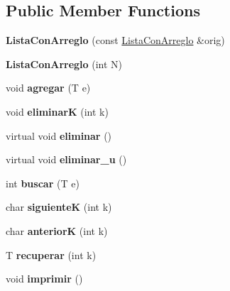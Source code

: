 \subsection*{Public Member Functions}
\begin{DoxyCompactItemize}
\item 
\hypertarget{class_lista_con_arreglo_ab7a22a8f04de9403d32a7431d4dd9627}{{\bfseries Lista\+Con\+Arreglo} (const \hyperlink{class_lista_con_arreglo}{Lista\+Con\+Arreglo} \&orig)}\label{class_lista_con_arreglo_ab7a22a8f04de9403d32a7431d4dd9627}

\item 
\hypertarget{class_lista_con_arreglo_a9541812a0019b76c6529184356913a59}{{\bfseries Lista\+Con\+Arreglo} (int N)}\label{class_lista_con_arreglo_a9541812a0019b76c6529184356913a59}

\item 
\hypertarget{class_lista_con_arreglo_a5336f6ef59e2cfaa008c4ad8cbee9f25}{void {\bfseries agregar} (T e)}\label{class_lista_con_arreglo_a5336f6ef59e2cfaa008c4ad8cbee9f25}

\item 
\hypertarget{class_lista_con_arreglo_acd8b8f484dc440dc64dc58cad375e7e4}{void {\bfseries eliminar\+K} (int k)}\label{class_lista_con_arreglo_acd8b8f484dc440dc64dc58cad375e7e4}

\item 
\hypertarget{class_lista_con_arreglo_a1d4ea3c3bbefa8d2c12ea520e12f5f9c}{virtual void {\bfseries eliminar} ()}\label{class_lista_con_arreglo_a1d4ea3c3bbefa8d2c12ea520e12f5f9c}

\item 
\hypertarget{class_lista_con_arreglo_a9f0f4138dcf42e664213ffbcedce2056}{virtual void {\bfseries eliminar\+\_\+u} ()}\label{class_lista_con_arreglo_a9f0f4138dcf42e664213ffbcedce2056}

\item 
\hypertarget{class_lista_con_arreglo_af2fe968f5ec674cb9640e11a1bcaab99}{int {\bfseries buscar} (T e)}\label{class_lista_con_arreglo_af2fe968f5ec674cb9640e11a1bcaab99}

\item 
\hypertarget{class_lista_con_arreglo_a8a3d5d83291eeab7d9dbb2108a6942ea}{char {\bfseries siguiente\+K} (int k)}\label{class_lista_con_arreglo_a8a3d5d83291eeab7d9dbb2108a6942ea}

\item 
\hypertarget{class_lista_con_arreglo_a78e25313648f0d4f188f61f60d7ba4b6}{char {\bfseries anterior\+K} (int k)}\label{class_lista_con_arreglo_a78e25313648f0d4f188f61f60d7ba4b6}

\item 
\hypertarget{class_lista_con_arreglo_af880c9a6795cf9281f2a217d0a4b0c07}{T {\bfseries recuperar} (int k)}\label{class_lista_con_arreglo_af880c9a6795cf9281f2a217d0a4b0c07}

\item 
\hypertarget{class_lista_con_arreglo_aa8267cef7510ef79626a812b3c85505d}{void {\bfseries imprimir} ()}\label{class_lista_con_arreglo_aa8267cef7510ef79626a812b3c85505d}

\end{DoxyCompactItemize}

